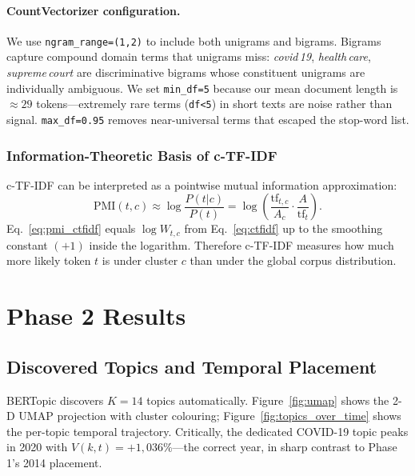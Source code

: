 \documentclass[10pt,twocolumn,a4paper]{article}
\begin{document}
\paragraph{CountVectorizer configuration.} We use \texttt{ngram\_range=(1,2)} to include both unigrams and bigrams. Bigrams capture compound domain terms that unigrams miss: \emph{covid\,19}, \emph{health\,care}, \emph{supreme\,court} are discriminative bigrams whose constituent unigrams are individually ambiguous. We set \texttt{min\_df=5} because our mean document length is $\approx 29$ tokens---extremely rare terms (\texttt{df<5}) in short texts are noise rather than signal. \texttt{max\_df=0.95} removes near-universal terms that escaped the stop-word list.

\subsubsection{Information-Theoretic Basis of c-TF-IDF}
\label{sec:ctfidf_info}

c-TF-IDF can be interpreted as a pointwise mutual information approximation:
\begin{equation}
\label{eq:pmi_ctfidf}
\text{PMI}(t,c) \approx \log\!\frac{P(t|c)}{P(t)}
= \log\!\left(\frac{\text{tf}_{t,c}}{A_c}\cdot\frac{A}{\text{tf}_t}\right).
\end{equation}
Eq.~\eqref{eq:pmi_ctfidf} equals $\log W_{t,c}$ from Eq.~\eqref{eq:ctfidf} up to the smoothing constant $(+1)$ inside the logarithm. Therefore c-TF-IDF measures how much more likely token $t$ is under cluster $c$ than under the global corpus distribution.

\section{Phase 2 Results}
\label{sec:results}

\subsection{Discovered Topics and Temporal Placement}

BERTopic discovers $K = 14$ topics automatically. Figure~\ref{fig:umap} shows the 2-D UMAP projection with cluster colouring; Figure~\ref{fig:topics_over_time} shows the per-topic temporal trajectory. Critically, the dedicated COVID-19 topic peaks in 2020 with $V(k,t) = +1{,}036\%$---the correct year, in sharp contrast to Phase 1's 2014 placement.
\end{document}
